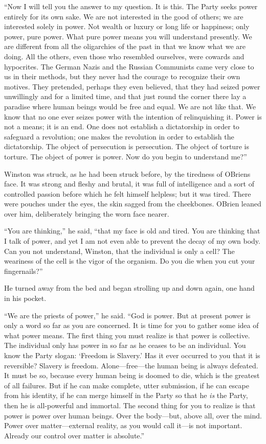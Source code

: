 ``Now I will tell you the answer to my question. It is this. The Party
seeks power entirely for its own sake. We are not interested in the good
of others; we are interested solely in power. Not wealth or luxury or
long life or happiness; only power, pure power. What pure power means
you will understand presently. We are different from all the oligarchies
of the past in that we know what we are doing. All the others, even
those who resembled ourselves, were cowards and hypocrites. The German
Nazis and the Russian Communists came very close to us in their methods,
but they never had the courage to recognize their own motives. They
pretended, perhaps they even believed, that they had seized power
unwillingly and for a limited time, and that just round the corner there
lay a paradise where human beings would be free and equal. We are not
like that. We know that no one ever seizes power with the intention of
relinquishing it. Power is not a means; it is an end. One does not
establish a dictatorship in order to safeguard a revolution; one makes
the revolution in order to establish the dictatorship. The object of
persecution is persecution. The object of torture is torture. The object
of power is power. Now do you begin to understand me?''

Winston was struck, as he had been struck before, by the tiredness of
O\textquotesingle Brien\textquotesingle s face. It was strong and fleshy
and brutal, it was full of intelligence and a sort of controlled passion
before which he felt himself helpless; but it was tired. There were
pouches under the eyes, the skin sagged from the cheekbones.
O\textquotesingle Brien leaned over him, deliberately bringing the worn
face nearer.

``You are thinking,'' he said, ``that my face is old and tired. You are
thinking that I talk of power, and yet I am not even able to prevent the
decay of my own body. Can you not understand, Winston, that the
individual is only a cell? The weariness of the cell is the vigor of the
organism. Do you die when you cut your fingernails?''

He turned away from the bed and began strolling up and down again, one
hand in his pocket.

``We are the priests of power,'' he said. ``God is power. But at present
power is only a word so far as you are concerned. It is time for you to
gather some idea of what power means. The first thing you must realize
is that power is collective. The individual only has power in so far as
he ceases to be an individual. You know the Party slogan:
`Freedom is Slavery.' Has it ever
occurred to you that it is reversible? Slavery is freedom.
Alone---free---the human being is always defeated. It must be so,
because every human being is doomed to die, which is the greatest of all
failures. But if he can make complete, utter submission, if he can
escape from his identity, if he can merge himself in the Party so that
he \emph{is} the Party, then he is all-powerful and immortal. The second
thing for you to realize is that power is power over human beings. Over
the body---but, above all, over the mind. Power over matter---external
reality, as you would call it---is not important. Already our control
over matter is absolute.''

